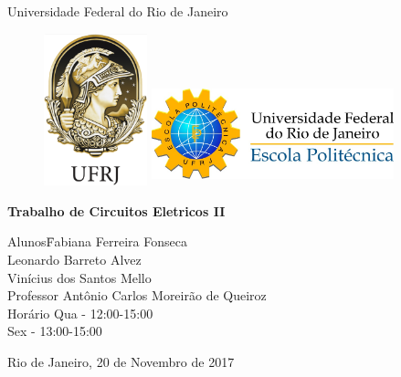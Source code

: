 \documentclass[a4paper, 12pt]{article}
\begin{document}
\begin{titlepage}
    \begin{center}
        \huge{Universidade Federal do Rio de Janeiro}

\vspace{10pt}
\begin{figure}[!ht]
\centering
\includegraphics[width=3cm]{pictures/minerva.png}
\hspace{3cm}
\includegraphics[height=3cm, width=7cm]{pictures/poli.jpg}
\end{figure}
        \vspace{85pt}
        \textbf{\LARGE{Trabalho de Circuitos Eletricos II}}
        \vspace{160pt}
    \end{center}
    
    \begin{flushleft}
        \begin{tabbing}
            Alunos\qquad\qquad\= Fabiana Ferreira Fonseca\\
            \> Leonardo Barreto Alvez\\
            \> Vinícius dos Santos Mello\\
            Professor\> Antônio Carlos Moreirão de Queiroz \\
            Horário\> Qua - 12:00-15:00\\
            		\> Sex - 13:00-15:00
        
    \end{tabbing}
          
    \end{flushleft}
    
    \begin{center}
        \vspace{\fill}
        Rio de Janeiro, 20 de Novembro de 2017
    \end{center}
\end{titlepage}
\end{document}
